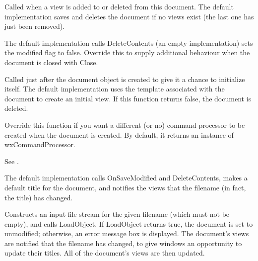 

Called when a view is added to or deleted from this document. The default
implementation saves and deletes the document if no views exist (the last
one has just been removed).



The default implementation calls DeleteContents (an empty implementation)
sets the modified flag to false. Override this to
supply additional behaviour when the document is closed with Close.



Called just after the document object is created to give it a chance
to initialize itself. The default implementation uses the
template associated with the document to create an initial view.
If this function returns false, the document is deleted.



Override this function if you want a different (or no) command processor
to be created when the document is created. By default, it returns
an instance of wxCommandProcessor.

See .



The default implementation calls OnSaveModified and DeleteContents, makes a default title for the
document, and notifies the views that the filename (in fact, the title) has changed.



Constructs an input file stream for the given filename (which must not be empty),
and calls LoadObject. If LoadObject returns true, the document is set to
unmodified; otherwise, an error message box is displayed. The document's
views are notified that the filename has changed, to give windows an opportunity
to update their titles. All of the document's views are then updated.

